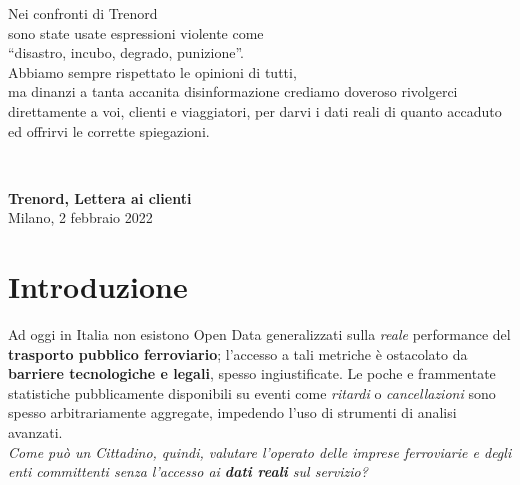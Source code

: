 \documentclass[12pt,italian]{report}
\begin{document}
	
	\frontespizio
	\beforepreface
	
	\hfill
	\begin{minipage}{15cm}
		\hfill
		\begin{minipage}[t]{11cm}
			\raggedleft \large
			{
				\sl
				
				Nei confronti di Trenord \\
				sono state usate espressioni violente come \\
				``disastro, incubo, degrado, punizione''. \\
				\bigskip
				Abbiamo sempre rispettato le opinioni di tutti,\\
				ma dinanzi a tanta accanita disinformazione crediamo doveroso rivolgerci direttamente a voi, clienti e viaggiatori, per darvi i dati reali di quanto accaduto ed offrirvi le corrette spiegazioni.
				
				\bigskip
			}
		\end{minipage} \\
			\raggedleft \large
			
			\textbf{Trenord, Lettera ai clienti} \\
			Milano, 2 febbraio 2022
	\end{minipage}
	
	
	\afterpreface
	
	\chapter{Introduzione}
	Ad oggi in Italia non esistono Open Data generalizzati sulla \textit{reale} performance del \textbf{trasporto pubblico ferroviario}; l'accesso a tali metriche è ostacolato da \textbf{barriere tecnologiche e legali}, spesso ingiustificate. 
	Le poche e frammentate statistiche pubblicamente disponibili su eventi come \textit{ritardi} o \textit{cancellazioni} sono spesso arbitrariamente aggregate, impedendo l'uso di strumenti di analisi avanzati. \\
	
	\textit{Come può un Cittadino, quindi, valutare l'operato delle imprese ferroviarie e degli enti committenti senza l'accesso ai \textbf{dati reali} sul servizio?} \\
	
\end{document}
